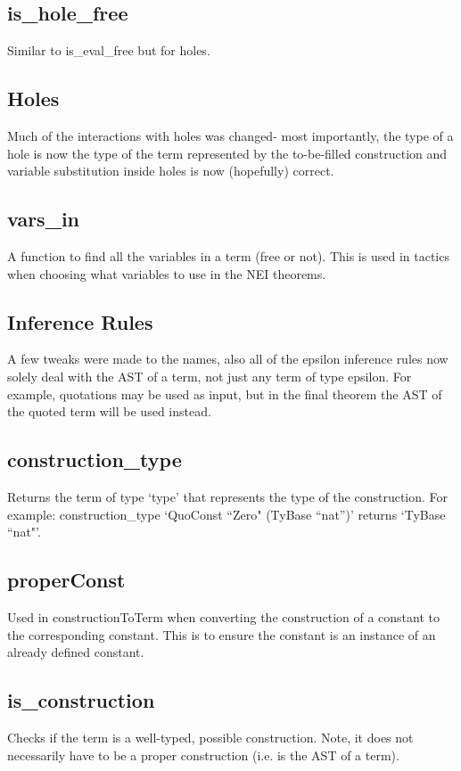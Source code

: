 \documentclass{article}
\begin{document}
\subsection{is\_hole\_free}
Similar to is\_eval\_free but for holes.

\subsection{Holes}
Much of the interactions with holes was changed- most importantly, the type of a hole is now the type of the term represented by the to-be-filled construction and variable substitution inside holes is now (hopefully) correct.  

\subsection{vars\_in}
A function to find all the variables in a term (free or not). This is used in tactics when choosing what variables to use in the NEI theorems. 

\subsection{Inference Rules}
A few tweaks were made to the names, also all of the epsilon inference rules now solely deal with the AST of a term, not just any term of type epsilon. For example, quotations may be used as input, but in the final theorem the AST of the quoted term will be used instead. 

\subsection{construction\_type}
Returns the term of type `type' that represents the type of the construction. For example: construction\_type `QuoConst ``Zero" (TyBase ``nat'')' returns `TyBase ``nat"'.

\subsection{properConst}
Used in constructionToTerm when converting the construction of a constant to the corresponding constant. This is to ensure the constant is an instance of an already defined constant. 

\subsection{is\_construction}
Checks if the term is a well-typed, possible construction. Note, it does not necessarily have to be a proper construction (i.e. is the AST of a term).
\end{document}
